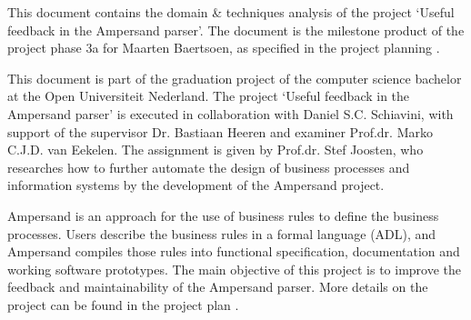 This document contains the domain \& techniques analysis of the project `Useful feedback in the Ampersand parser'.
The document is the milestone product of the project phase 3a for Maarten Baertsoen, as specified in the project planning  .

This document is part of the graduation project of the computer science bachelor at the Open Universiteit Nederland.
The project `Useful feedback in the Ampersand parser' is executed in collaboration with Daniel S.C. Schiavini, with support of the supervisor Dr. Bastiaan Heeren and examiner Prof.dr. Marko C.J.D. van Eekelen.
The assignment is given by Prof.dr. Stef Joosten, who researches how to further automate the design of business processes and information systems by the development of the Ampersand project.

Ampersand is an approach for the use of business rules to define the business processes.
Users describe the business rules in a formal language (ADL), and Ampersand compiles those rules into functional specification, documentation and working software prototypes.
The main objective of this project is to improve the feedback and maintainability of the Ampersand parser.
More details on the project can be found in the project plan .

